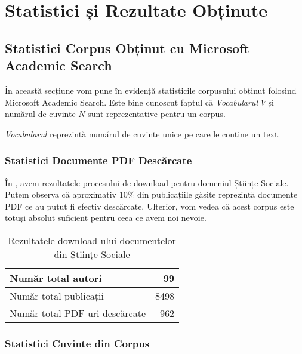 \chapter{Statistici și Rezultate Obținute}
\label{chapter:measurements}

\section{Statistici Corpus Obținut cu Microsoft Academic Search}

În această secțiune vom pune în evidență statisticile corpusului obținut folosind Microsoft Academic Search. Este bine cunoscut faptul că \textit{Vocabularul} $V$ și numărul de cuvinte $N$ sunt reprezentative pentru un corpus.


\textit{Vocabularul} reprezintă numărul de cuvinte unice pe care le conține un text.


\subsection{Statistici Documente PDF Descărcate}

În , avem rezultatele procesului de download pentru domeniul Științe Sociale. Putem observa că aproximativ 10\% din publicațiile găsite reprezintă documente PDF ce au putut fi efectiv descărcate. Ulterior, vom vedea că acest corpus este totuși absolut suficient pentru ceea ce avem noi nevoie.

\begin{center}
\begin{table}[htb]
  \caption{Rezultatele download-ului documentelor din Științe Sociale}
  \begin{tabular}{|l|r|}
    \hline
    Număr total autori & 99 \\
    \hline
    Număr total publicații & 8498 \\
     \hline
    Număr total PDF-uri descărcate & 962  \\
     \hline
  \end{tabular}
  \label{table:downloaded-pdf-summary}
\end{table}
\end{center}

\subsection{Statistici Cuvinte din Corpus}

